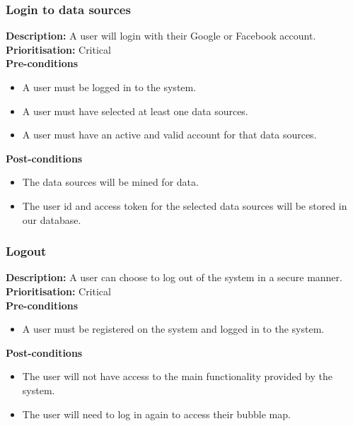 \documentclass[hidelinks,english]{article}
\begin{document}
    		\subsubsection{Login to data sources}
				\textbf{Description:}  A user will login with their Google or Facebook account.\\
    			\textbf{Prioritisation:} Critical\\
      			\textbf{Pre-conditions}
    			\begin{itemize}
        			\item A user must be logged in to the system.
        			\item A user must have selected at least one data sources.
        			\item A user must have an active and valid account for that data sources.
    			\end{itemize}
    			\textbf{Post-conditions}
     			\begin{itemize}
        			\item The data sources will be mined for data.
        			\item The user id and access token for the selected data sources will be stored in our database.
    			\end{itemize}
    			
    			
    		\subsubsection{Logout}
				\textbf{Description:}  A user can choose to log out of the system in a secure manner.\\
    			\textbf{Prioritisation:} Critical\\
      			\textbf{Pre-conditions}
    			\begin{itemize}
        			\item A user must be registered on the system and logged in to the system.
    			\end{itemize}
    			\textbf{Post-conditions}
     			\begin{itemize}
        			\item The user will not have access to the main functionality provided by the system.
        			\item The user will need to log in again to access their bubble map.
    			\end{itemize}
\end{document}
